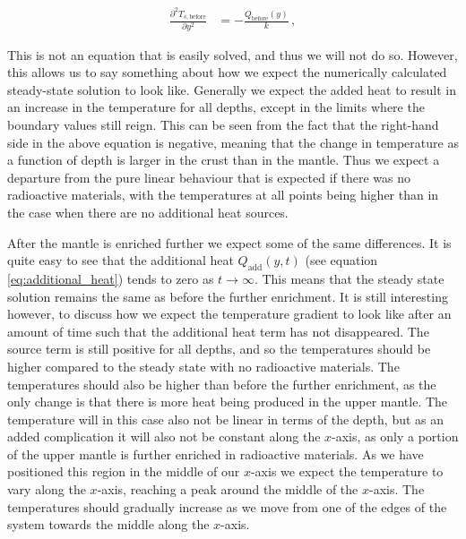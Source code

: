 \documentclass[reprint,english,notitlepage]{revtex4-1}  %
\begin{document}
\begin{align*}
\frac{\partial^2 T_{s,\text{before}}}{\partial y^2} &= -\frac{Q_{\text{before}}(y)}{k} \, , 
\end{align*} 

This is not an equation that is easily solved, and thus we will not do so. However, this allows us to say something about how we expect the numerically calculated steady-state solution to look like. Generally we expect the added heat to result in an increase in the temperature for all depths, except in the limits where the boundary values still reign. This can be seen from the fact that the right-hand side in the above equation is negative, meaning that the change in temperature as a function of depth is larger in the crust than in the mantle. Thus we expect a departure from the pure linear behaviour that is expected if there was no radioactive materials, with the temperatures at all points being higher than in the case when there are no additional heat sources.

After the mantle is enriched further we expect some of the same differences. It is quite easy to see that the additional heat $Q_{\text{add}}(y,t)$ (see equation \eqref{eq:additional_heat}) tends to zero as $t\to \infty$. This means that the steady state solution remains the same as before the further enrichment. It is still interesting however, to discuss how we expect the temperature gradient to look like after an amount of time such that the additional heat term has not disappeared. The source term is still positive for all depths, and so the temperatures should be higher compared to the steady state with no radioactive materials. The temperatures should also be higher than before the further enrichment, as the only change is that there is more heat being produced in the upper mantle. The temperature will in this case also not be linear in terms of the depth, but as an added complication it will also not be constant along the $x$-axis, as only a portion of the upper mantle is further enriched in radioactive materials. As we have positioned this region in the middle of our $x$-axis we expect the temperature to vary along the $x$-axis, reaching a peak around the middle of the $x$-axis. The temperatures should gradually increase as we move from one of the edges of the system towards the middle along the $x$-axis. 



\end{document}
